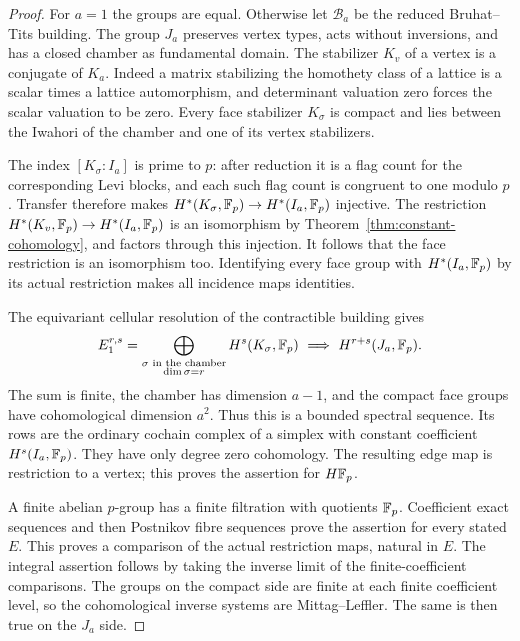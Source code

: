 \begin{proof}
For $a=1$ the groups are equal.  Otherwise let $\mathcal B_a$ be the
reduced Bruhat--Tits building.  The group $J_a$ preserves vertex types,
acts without inversions, and has a closed chamber as fundamental domain.
The stabilizer $K_v$ of a vertex is a conjugate of $K_a$.  Indeed a matrix
stabilizing the homothety class of a lattice is a scalar times a lattice
automorphism, and determinant valuation zero forces the scalar valuation
to be zero.  Every face stabilizer $K_\sigma$ is compact and lies between
the Iwahori of the chamber and one of its vertex stabilizers.

The index $[K_\sigma:I_a]$ is prime to $p$: after reduction it is a flag
count for the corresponding Levi blocks, and each such flag count is
congruent to one modulo $p$.  Transfer therefore makes
$H^*(K_\sigma,\mathbb F_p)\to H^*(I_a,\mathbb F_p)$ injective.  The restriction
$H^*(K_v,\mathbb F_p)\to H^*(I_a,\mathbb F_p)$ is an isomorphism by
Theorem~\ref{thm:constant-cohomology}, and factors through this injection.
It follows that the face restriction is an isomorphism too.  Identifying
every face group with $H^*(I_a,\mathbb F_p)$ by its actual restriction makes all
incidence maps identities.

The equivariant cellular resolution of the contractible building gives
\begin{equation}
 E_1^{r,s}=\bigoplus_{\substack{\sigma\text{ in the chamber}\\
                              \dim\sigma=r}}
                 H^s(K_\sigma,\mathbb F_p)
       \ \Longrightarrow\ H^{r+s}(J_a,\mathbb F_p).
 \label{eq:const-building-ss}
\end{equation}
The sum is finite, the chamber has dimension $a-1$, and the compact face
groups have cohomological dimension $a^2$.  Thus this is a bounded
spectral sequence.  Its rows are the ordinary cochain complex of a
simplex with constant coefficient $H^s(I_a,\mathbb F_p)$.  They have only degree
zero cohomology.  The resulting edge map is restriction to a vertex;
this proves the assertion for $H\mathbb F_p$.

A finite abelian $p$-group has a finite filtration with quotients $\mathbb F_p$.
Coefficient exact sequences and then Postnikov fibre sequences prove the
assertion for every stated $E$.  This proves a comparison of the actual
restriction maps, natural in $E$.  The integral assertion follows by
taking the inverse limit of the finite-coefficient comparisons.  The
groups on the compact side are finite at each finite coefficient level,
so the cohomological inverse systems are Mittag--Leffler.  The same is
then true on the $J_a$ side.
\end{proof}


